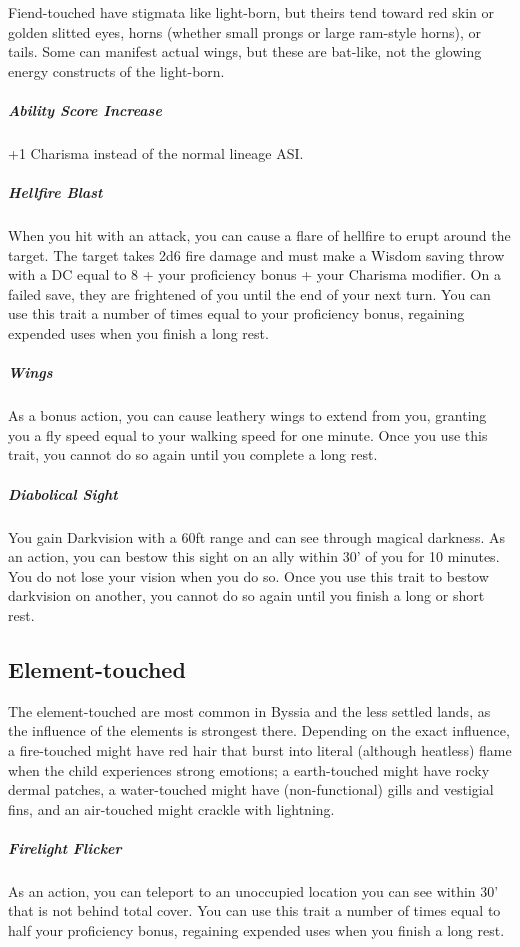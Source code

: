 Fiend-touched have stigmata like light-born, but theirs tend toward red skin or golden slitted eyes, horns (whether small prongs or large ram-style horns), or tails. Some can manifest actual wings, but these are bat-like, not the glowing energy constructs of the light-born.

\subparagraph*{Ability Score Increase}  +1 Charisma instead of the normal lineage ASI.

\subparagraph*{Hellfire Blast}  When you hit with an attack, you can cause a flare of hellfire to erupt around the target. The target takes 2d6 fire damage and must make a Wisdom saving throw with a DC equal to 8 + your proficiency bonus + your Charisma modifier. On a failed save, they are frightened of you until the end of your next turn. You can use this trait a number of times equal to your proficiency bonus, regaining expended uses when you finish a long rest.

\subparagraph*{Wings}  As a bonus action, you can cause leathery wings to extend from you, granting you a fly speed equal to your walking speed for one minute. Once you use this trait, you cannot do so again until you complete a long rest.

\subparagraph*{Diabolical Sight}  You gain Darkvision with a 60ft range and can see through magical darkness. As an action, you can bestow this sight on an ally within 30' of you for 10 minutes. You do not lose your vision when you do so. Once you use this trait to bestow darkvision on another, you cannot do so again until you finish a long or short rest.

\subsection{Element-touched} %

The element-touched are most common in Byssia and the less settled lands, as the influence of the elements is strongest there. Depending on the exact influence, a fire-touched might have red hair that burst into literal (although heatless) flame when the child experiences strong emotions; a earth-touched might have rocky dermal patches, a water-touched might have (non-functional) gills and vestigial fins, and an air-touched might crackle with lightning.

\subparagraph*{Firelight Flicker}  As an action, you can teleport to an unoccupied location you can see within 30' that is not behind total cover. You can use this trait a number of times equal to half your proficiency bonus, regaining expended uses when you finish a long rest.

